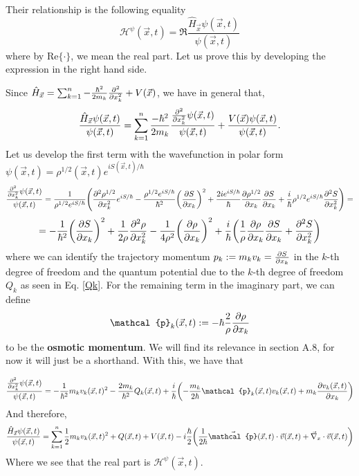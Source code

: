 \documentclass[11pt, a4paper]{article} %
\newcommand{\h}{\mathcal{H}}
\DeclareRobustCommand{\mybox}[2][gray!10]{%
\begin{tcolorbox}[   %
        left=0.2cm,
        right=0.2cm,
        top=0.15cm,
        bottom=0.15cm,
        colback=#1,
        colframe=#1,
        width=\dimexpr\textwidth\relax, 
        enlarge left by=0mm,
        boxsep=5pt,
        arc=0pt,outer arc=0pt,
        ]
        #2
\end{tcolorbox}
}
\begin{document}
Their relationship is the following equality
\begin{equation}\label{117}
\h^\psi(\vec{x},t)=\Re{\frac{\hat{H}_{\vec{x}}\psi(\vec{x},t)}{\psi(\vec{x},t)}}
\end{equation}
where by Re$\{\cdot\}$, we mean the real part. Let us prove this by developing the expression in the right hand side.

\mybox{
Since $\hat{H}_{\vec{x}}=\sum_{k=1}^n-\frac{\hbar^2}{2m_k}\pdv[2]{}{x_k}+V(\vec{x})$, we have in general that,
\begin{equation}
\frac{\hat{H}_{\vec{x}}\psi(\vec{x},t)}{\psi(\vec{x},t)}=\sum_{k=1}^n \frac{-\hbar^2}{2m_k}\frac{\pdv[2]{}{x_k}\psi(\vec{x},t)}{\psi(\vec{x},t)}+\frac{V(\vec{x})\psi(\vec{x},t)}{\psi(\vec{x},t)}.
\end{equation}
Let us develop the first term with the wavefunction in polar form $\psi(\vec{x},t)=\rho^{1/2}(\vec{x},t)e^{iS(\vec{x},t)/\hbar}$
\begin{equation}
\frac{\pdv[2]{}{x_k}\psi(\vec{x},t)}{\psi(\vec{x},t)}=\frac{1}{\rho^{1/2}e^{iS/\hbar}}\qty(\pdv[2]{\rho^{1/2}}{x_k}e^{iS/\hbar}-\frac{\rho^{1/2}e^{iS/\hbar}}{\hbar^2}\qty(\pdv{S}{x_k})^2+\frac{2ie^{iS/\hbar}}{\hbar}\pdv{\rho^{1/2}}{x_k}\pdv{S}{x_k}+\frac{i}{\hbar}\rho^{1/2}e^{iS/\hbar}\pdv[2]{S}{x_k})=
\end{equation}
$$
=-\frac{1}{\hbar^2}\qty(\pdv{S}{x_k})^2+\frac{1}{2\rho}\pdv[2]{\rho}{x_k}-\frac{1}{4\rho^2}\qty(\pdv{\rho}{x_k})^2+\frac{i}{\hbar}\qty(\frac{1}{\rho}\pdv{\rho}{x_k}\pdv{S}{x_k}+\pdv[2]{S}{x_k})
$$
where we can identify the trajectory momentum $p_k:=m_kv_k=\pdv{S}{x_k}$ in the $k$-th degree of freedom and the quantum potential due to the $k$-th degree of freedom $Q_k$ as seen in Eq. \eqref{Qk}. For the remaining term in the imaginary part, we can define 
\begin{equation}
\mathcal{p}_k(\vec{x},t):=-\hbar\frac{2}{\rho}\pdv{\rho}{x_k}
\end{equation}
to be the {\bf osmotic momentum}. We will find its relevance in section A.8, for now it will just be a shorthand. With this, we have that
}\mybox{
\begin{equation}
\frac{\pdv[2]{}{x_k}\psi(\vec{x},t)}{\psi(\vec{x},t)}=-\frac{1}{\hbar^2}m_kv_k(\vec{x},t)^2-\frac{2m_k}{\hbar^2}Q_k(\vec{x},t)+\frac{i}{\hbar}\qty(-\frac{m_k}{2\hbar}\mathcal{p}_k(\vec{x},t)v_k(\vec{x},t)+m_k\pdv{v_k(\vec{x},t)}{x_k})
\end{equation}
And therefore,
\begin{equation}\label{weakH}
\frac{\hat{H}_{\vec{x}}\psi(\vec{x},t)}{\psi(\vec{x},t)}=\sum_{k=1}^n\frac{1}{2}m_kv_k(\vec{x},t)^2+Q(\vec{x},t)+V(\vec{x},t)-i\frac{\hbar}{2}\qty(\frac{1}{2\hbar}\vec{\mathcal{p}}(\vec{x},t)\cdot\vec{v}(\vec{x},t)+\vec{\nabla}_x\cdot \vec{v}(\vec{x},t))
\end{equation}
Where we see that the real part is $\h^\psi(\vec{x},t)$.


}
\end{document}

